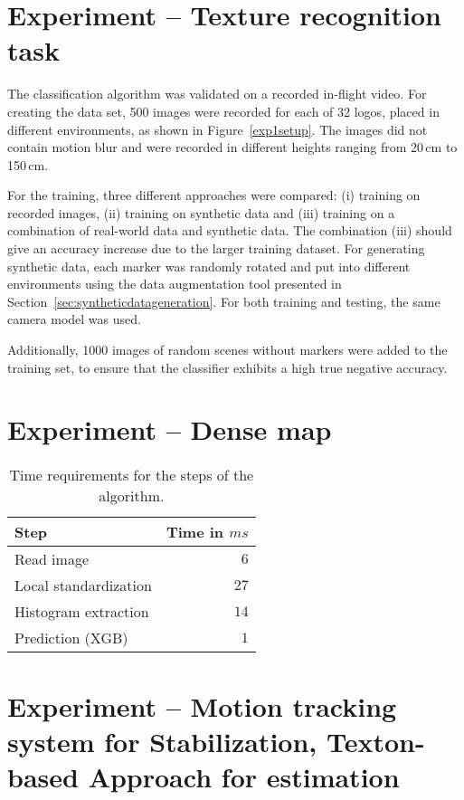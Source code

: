 \section{Experiment -- Texture recognition task} 
\label{sec:experiment1}

The classification algorithm was validated on a recorded in-flight
video. For creating the data set, 500 images were recorded for each of
32 logos, placed in different environments, as shown in
Figure~\ref{exp1setup}. The images did not contain motion blur and
were recorded in different heights ranging from 20\,cm to 150\,cm.

For the training, three different approaches were compared: (i)
training on recorded images, (ii) training on synthetic data and (iii)
training on a combination of real-world data and synthetic data.  The
combination (iii) should give an accuracy increase due to the larger
training dataset. For generating synthetic data, each marker was
randomly rotated and put into different environments using the data
augmentation tool presented in
Section~\ref{sec:syntheticdatageneration}. For both training and
testing, the same camera model was used.

Additionally, 1000 images of random scenes without markers were added
to the training set, to ensure that the classifier exhibits a high
true negative accuracy.

\section{Experiment -- Dense map}
\label{sec:experiment4}

\begin{table}[h!]
  \centering
  \begin{tabular}{lr}
    \toprule
    Step & Time in $ms$\\
    \midrule
    Read image & $6$\\
    Local standardization & $27$\\
    Histogram extraction & $14$\\
    Prediction (XGB) & $1$\\    
    \bottomrule
  \end{tabular}
  \caption{{Time requirements for the steps of the algorithm.}}
  \label{tab:timerequirementsdense}

\end{table}

\section{Experiment -- Motion tracking system for Stabilization, Texton-based Approach for estimation}
\label{sec:experiment4}

